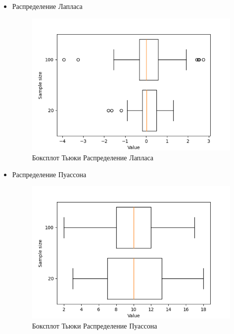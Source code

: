 \begin{itemize}
	\item{Распределение Лапласа}
	\begin{figure}[H]
		\begin{center}
			\includegraphics[scale=0.75]{part_boxplot/figures/laplace}
			\caption{Боксплот Тьюки Распределение Лапласа}
			\label{fig:boxplot_laplace}
		\end{center}
	\end{figure}
		
	\item{Распределение Пуассона}
	\begin{figure}[H]
		\begin{center}
			\includegraphics[scale=0.75]{part_boxplot/figures/poisson}
			\caption{Боксплот Тьюки Распределение Пуассона}
			\label{fig:boxplot_poisson}
		\end{center}
	\end{figure}
	

\end{itemize}
